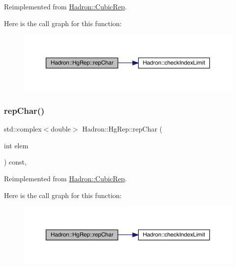 Reimplemented from \mbox{\hyperlink{structHadron_1_1CubicRep_af45227106e8e715e84b0af69cd3b36f8}{Hadron\+::\+Cubic\+Rep}}.

Here is the call graph for this function\+:
\nopagebreak
\begin{figure}[H]
\begin{center}
\leavevmode
\includegraphics[width=350pt]{d5/d3a/structHadron_1_1HgRep_a49537241226a4b230d73e72cb1a21de3_cgraph}
\end{center}
\end{figure}
\mbox{\label{structHadron_1_1HgRep_a49537241226a4b230d73e72cb1a21de3}} 
\subsubsection{\texorpdfstring{repChar()}{repChar()}\hspace{0.1cm}{\footnotesize\ttfamily [3/3]}}
{\footnotesize\ttfamily std\+::complex$<$double$>$ Hadron\+::\+Hg\+Rep\+::rep\+Char (\begin{DoxyParamCaption}\item[{int}]{elem }\end{DoxyParamCaption}) const\hspace{0.3cm}{\ttfamily [inline]}, {\ttfamily [virtual]}}



Reimplemented from \mbox{\hyperlink{structHadron_1_1CubicRep_af45227106e8e715e84b0af69cd3b36f8}{Hadron\+::\+Cubic\+Rep}}.

Here is the call graph for this function\+:
\nopagebreak
\begin{figure}[H]
\begin{center}
\leavevmode
\includegraphics[width=350pt]{d5/d3a/structHadron_1_1HgRep_a49537241226a4b230d73e72cb1a21de3_cgraph}
\end{center}
\end{figure}
\mbox{\label{structHadron_1_1HgRep_a1ca0a9c28a8e0a9aba561029b7e61f08}} 
